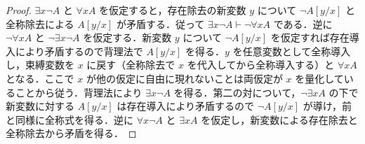 \begin{proof}
$\exists x\neg A$ と $\forall x A$ を仮定すると，存在除去の新変数 $y$ について $\neg A[y/x]$ と全称除去による $A[y/x]$ が矛盾する．従って $\exists x\neg A\vdash\neg\forall x A$ である．逆に $\neg\forall x A$ と $\neg\exists x\neg A$ を仮定する．新変数 $y$ について $\neg A[y/x]$ を仮定すれば存在導入により矛盾するので背理法で $A[y/x]$ を得る．$y$ を任意変数として全称導入し，束縛変数を $x$ に戻す（全称除去で $x$ を代入してから全称導入する）と $\forall x A$ となる．ここで $x$ が他の仮定に自由に現れないことは両仮定が $x$ を量化していることから従う．背理法により $\exists x\neg A$ を得る．第二の対について，$\neg\exists x A$ の下で新変数に対する $A[y/x]$ は存在導入により矛盾するので $\neg A[y/x]$ が導け，前と同様に全称式を得る．逆に $\forall x\neg A$ と $\exists x A$ を仮定し，新変数による存在除去と全称除去から矛盾を得る．
\end{proof}
